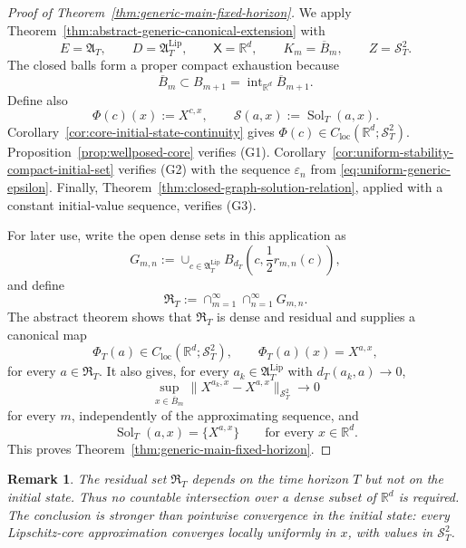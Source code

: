\documentclass[12pt,oneside, reqno]{amsart}
\newtheorem{remark}[theorem]{Remark}
\numberwithin{equation}{section}
\begin{document}
	
	\begin{proof}[Proof of Theorem~\ref{thm:generic-main-fixed-horizon}]
	We apply Theorem~\ref{thm:abstract-generic-canonical-extension} with
	\[
	E=\mathfrak A_T,
	\qquad
	D=\mathfrak A_T^{\mathrm{Lip}},
	\qquad
	\mathsf X=\mathbb R^d,
	\qquad
	K_m=\overline B_m,
	\qquad
	Z=\mathcal S_T^2.
	\]
	The closed balls form a proper compact exhaustion because
	\[
	\overline B_m\subset B_{m+1}
	=\operatorname{int}_{\mathbb R^d}\overline B_{m+1}.
	\]
	Define also
	\[
	\Phi(c)(x):=X^{c,x},
	\qquad
	\mathcal S(a,x):=\operatorname{Sol}_T(a,x).
	\]
	Corollary~\ref{cor:core-initial-state-continuity} gives
	$\Phi(c)\in C_{\mathrm{loc}}(\mathbb R^d;\mathcal S_T^2)$.
	Proposition~\ref{prop:wellposed-core} verifies
	\textnormal{(G1)}. Corollary~\ref{cor:uniform-stability-compact-initial-set}
	verifies \textnormal{(G2)} with the sequence
	$\varepsilon_n$ from \eqref{eq:uniform-generic-epsilon}. Finally,
	Theorem~\ref{thm:closed-graph-solution-relation}, applied with a
	constant initial-value sequence, verifies \textnormal{(G3)}.
	
	For later use, write the open dense sets in this application as
	\begin{equation}
		\label{eq:uniform-Gmn-definition}
		G_{m,n}
		:=
		\cup_{c\in\mathfrak A_T^{\mathrm{Lip}}}
		B_{d_T}\left(c,\frac12r_{m,n}(c)\right),
	\end{equation}
	and define
	\begin{equation}
		\label{eq:initial-state-independent-residual-set}
		\mathfrak R_T
		:=
		\cap_{m=1}^{\infty}
		\cap_{n=1}^{\infty}
		G_{m,n}.
	\end{equation}
	The abstract theorem shows that $\mathfrak R_T$ is dense and residual
	and supplies a canonical map
	\[
	\Phi_T(a)\in C_{\mathrm{loc}}(\mathbb R^d;\mathcal S_T^2),
	\qquad
	\Phi_T(a)(x)=X^{a,x},
	\]
	for every $a\in\mathfrak R_T$. It also gives, for every
	$a_k\in\mathfrak A_T^{\mathrm{Lip}}$ with $d_T(a_k,a)\to0$,
	\[
	\sup_{x\in\overline B_m}
	\|X^{a_k,x}-X^{a,x}\|_{\mathcal S_T^2}
	\longrightarrow0
	\]
	for every $m$, independently of the approximating sequence, and
	\[
	\operatorname{Sol}_T(a,x)=\{X^{a,x}\}
	\qquad
	\text{for every }x\in\mathbb R^d.
	\]
	This proves Theorem~\ref{thm:generic-main-fixed-horizon}.
\end{proof}
	\begin{remark}
		\label{rem:initial-state-independent-generic-set}
		The residual set $\mathfrak R_T$ depends on the time horizon $T$ but
		not on the initial state. Thus no countable intersection over a dense
		subset of $\mathbb R^d$ is required. The conclusion is stronger than
		pointwise convergence in the initial state: every Lipschitz-core
		approximation converges locally uniformly in $x$, with values in
		$\mathcal S_T^2$.
	\end{remark}
	
\end{document}
